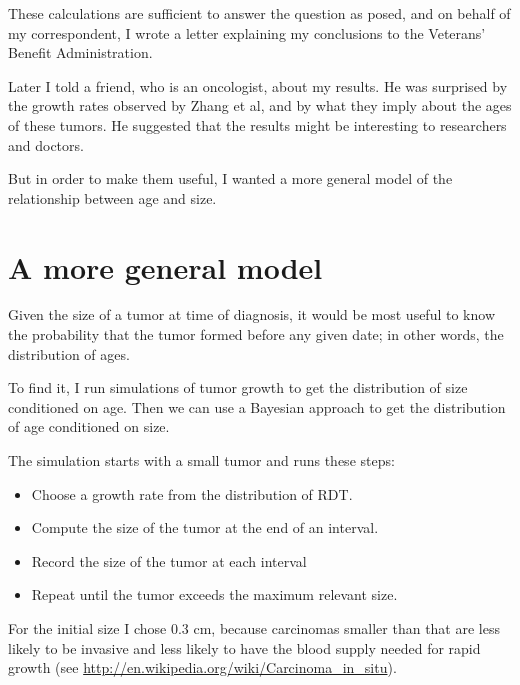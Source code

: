 \documentclass[12pt]{book}
\begin{document}
These calculations are sufficient to answer the question as
posed, and on behalf of my correspondent, I wrote a letter explaining
my conclusions to the Veterans' Benefit Administration.

Later I told a friend, who is an oncologist, about my results.  He was
surprised by the growth rates observed by Zhang et al, and by what
they imply about the ages of these tumors.  He suggested that the
results might be interesting to researchers and doctors.

But in order to make them useful, I wanted a more general model
of the relationship between age and size.


\section{A more general model}

Given the size of a tumor at time of diagnosis, it would be most
useful to know the probability that the tumor formed before
any given date; in other words, the distribution of ages.

To find it, I run simulations of tumor growth to get the
distribution of size conditioned on age.  Then we can use
a Bayesian approach to get the
distribution of age conditioned on size.

The simulation starts with a small tumor and runs these steps:

\begin{itemize}

\item Choose a growth rate from the distribution of RDT.

\item Compute the size of the tumor at the end of an interval.

\item Record the size of the tumor at each interval

\item Repeat until the tumor exceeds the maximum relevant size.

\end{itemize}

For the initial size I chose 0.3 cm, because carcinomas smaller than
that are less likely to be invasive and less likely to have the blood
supply needed for rapid growth (see
\url{http://en.wikipedia.org/wiki/Carcinoma_in_situ}).  
\end{document}
